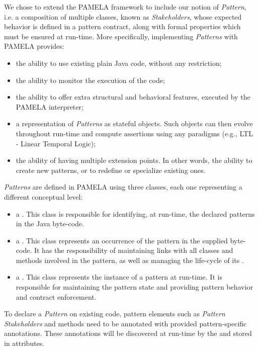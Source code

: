 We chose to extend the PAMELA framework to include our notion of \emph{Pattern}, i.e. a composition of multiple classes, known as \emph{Stakeholders}, whose expected behavior is defined in a pattern contract, along with formal properties which must be ensured at run-time. More specifically, implementing \emph{Patterns} with PAMELA provides:
\begin{itemize}
    \item the ability to use existing plain Java code, without any restriction;
    \item the ability to monitor the execution of the code;
    \item the ability to offer extra structural and behavioral features, executed by the PAMELA interpreter;
    \item a representation of \emph{Patterns} as stateful objects. Such objects can then evolve throughout run-time and compute assertions using any paradigms (e.g., LTL - Linear Temporal Logic);
    \item the ability of having multiple extension points. In other words, the ability to create new patterns, or to redefine or specialize existing ones.
\end{itemize}

\emph{Patterns} are defined in PAMELA using three classes, each one representing a different conceptual level:
\begin{itemize}
    \item a . This class is responsible for identifying, at run-time, the declared patterns in the Java byte-code.
    \item a . This class represents an occurrence of the pattern in the supplied byte-code. It has the responsibility of maintaining links with all classes and methods involved in the pattern, as well as managing the life-cycle of its .
    \item a . This class represents the instance of a pattern at run-time. It is responsible for maintaining the pattern state and providing pattern behavior and contract enforcement.
\end{itemize}

To declare a \emph{Pattern} on existing code, pattern elements such as \emph{Pattern Stakeholders} and methods need to be annotated with provided pattern-specific  annotations. These annotations will be discovered at run-time by the  and stored in  attributes.

